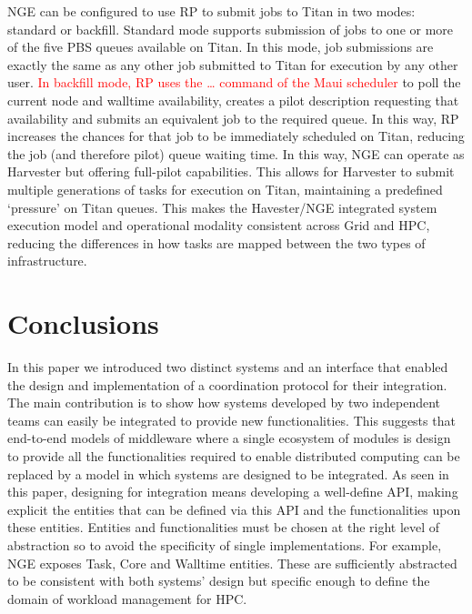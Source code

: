 \documentclass{webofc}
\begin{document}
NGE can be configured to use RP to submit jobs to Titan in two modes:
standard or backfill. Standard mode supports submission of jobs to one or
more of the five PBS queues available on Titan. In this mode, job submissions
are exactly the same as any other job submitted to Titan for execution by any
other user. \textcolor{red}{In backfill mode, RP uses the … command of the Maui scheduler} to
poll the current node and walltime availability, creates a pilot description
requesting that availability and submits an equivalent job to the required
queue. In this way, RP increases the chances for that job to be immediately
scheduled on Titan, reducing the job (and therefore pilot) queue waiting
time. In this way, NGE can operate as Harvester but offering full-pilot
capabilities. This allows for Harvester to submit multiple generations of
tasks for execution on Titan, maintaining a predefined ‘pressure’ on Titan
queues. This makes the Havester/NGE integrated system execution model and
operational modality consistent across Grid and HPC, reducing the differences
in how tasks are mapped between the two types of infrastructure.


\section{Conclusions}

In this paper we introduced two distinct systems and an interface that
enabled the design and implementation of a coordination protocol for their
integration. The main contribution is to show how systems developed by two
independent teams can easily be integrated to provide new functionalities.
This suggests that end-to-end models of middleware where a single ecosystem
of modules is design to provide all the functionalities required to enable
distributed computing can be replaced by a model in which systems are
designed to be integrated. As seen in this paper, designing for integration
means developing a well-define API, making explicit the entities that can be
defined via this API and the functionalities upon these entities. Entities
and functionalities must be chosen at the right level of abstraction so to
avoid the specificity of single implementations. For example, NGE exposes
Task, Core and Walltime entities. These are sufficiently abstracted to be
consistent with both systems’ design but specific enough to define the domain
of workload management for HPC.
\end{document}
